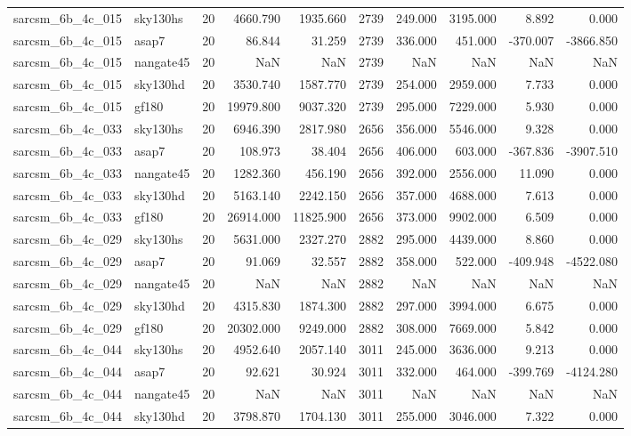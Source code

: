 \documentclass{article}
\begin{document}
\begin{longtable}{llrrrrrrrr}
sarcsm\_6b\_4c\_015 & sky130hs & 20 & 4660.790 & 1935.660 & 2739 & 249.000 & 3195.000 & 8.892 & 0.000 \\
sarcsm\_6b\_4c\_015 & asap7 & 20 & 86.844 & 31.259 & 2739 & 336.000 & 451.000 & -370.007 & -3866.850 \\
sarcsm\_6b\_4c\_015 & nangate45 & 20 & NaN & NaN & 2739 & NaN & NaN & NaN & NaN \\
sarcsm\_6b\_4c\_015 & sky130hd & 20 & 3530.740 & 1587.770 & 2739 & 254.000 & 2959.000 & 7.733 & 0.000 \\
sarcsm\_6b\_4c\_015 & gf180 & 20 & 19979.800 & 9037.320 & 2739 & 295.000 & 7229.000 & 5.930 & 0.000 \\
sarcsm\_6b\_4c\_033 & sky130hs & 20 & 6946.390 & 2817.980 & 2656 & 356.000 & 5546.000 & 9.328 & 0.000 \\
sarcsm\_6b\_4c\_033 & asap7 & 20 & 108.973 & 38.404 & 2656 & 406.000 & 603.000 & -367.836 & -3907.510 \\
sarcsm\_6b\_4c\_033 & nangate45 & 20 & 1282.360 & 456.190 & 2656 & 392.000 & 2556.000 & 11.090 & 0.000 \\
sarcsm\_6b\_4c\_033 & sky130hd & 20 & 5163.140 & 2242.150 & 2656 & 357.000 & 4688.000 & 7.613 & 0.000 \\
sarcsm\_6b\_4c\_033 & gf180 & 20 & 26914.000 & 11825.900 & 2656 & 373.000 & 9902.000 & 6.509 & 0.000 \\
sarcsm\_6b\_4c\_029 & sky130hs & 20 & 5631.000 & 2327.270 & 2882 & 295.000 & 4439.000 & 8.860 & 0.000 \\
sarcsm\_6b\_4c\_029 & asap7 & 20 & 91.069 & 32.557 & 2882 & 358.000 & 522.000 & -409.948 & -4522.080 \\
sarcsm\_6b\_4c\_029 & nangate45 & 20 & NaN & NaN & 2882 & NaN & NaN & NaN & NaN \\
sarcsm\_6b\_4c\_029 & sky130hd & 20 & 4315.830 & 1874.300 & 2882 & 297.000 & 3994.000 & 6.675 & 0.000 \\
sarcsm\_6b\_4c\_029 & gf180 & 20 & 20302.000 & 9249.000 & 2882 & 308.000 & 7669.000 & 5.842 & 0.000 \\
sarcsm\_6b\_4c\_044 & sky130hs & 20 & 4952.640 & 2057.140 & 3011 & 245.000 & 3636.000 & 9.213 & 0.000 \\
sarcsm\_6b\_4c\_044 & asap7 & 20 & 92.621 & 30.924 & 3011 & 332.000 & 464.000 & -399.769 & -4124.280 \\
sarcsm\_6b\_4c\_044 & nangate45 & 20 & NaN & NaN & 3011 & NaN & NaN & NaN & NaN \\
sarcsm\_6b\_4c\_044 & sky130hd & 20 & 3798.870 & 1704.130 & 3011 & 255.000 & 3046.000 & 7.322 & 0.000 \\

\end{longtable}
\end{document}
